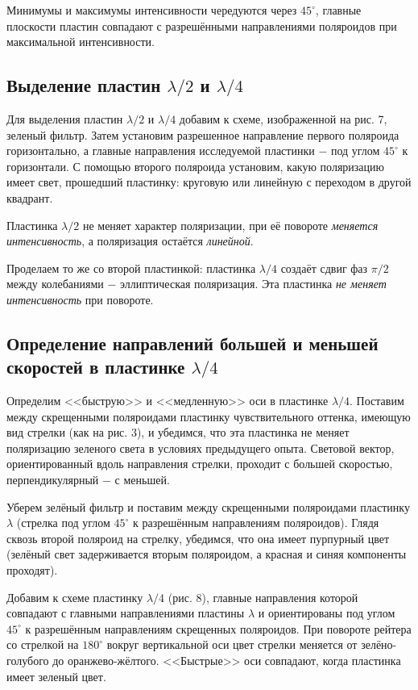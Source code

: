 \documentclass[a4paper,12pt]{article} %
\begin{document}
\hfill \break Минимумы и максимумы интенсивности чередуются через $45^\circ$, главные плоскости пластин совпадают с разрешёнными направлениями поляроидов при максимальной интенсивности.

\subsection{Выделение пластин $\lambda/2$ и $\lambda/4$}
\hfill \break Для выделения пластин $\lambda/2$ и $\lambda/4$ добавим к схеме, изображенной на рис. 7, зеленый фильтр. Затем установим разрешенное направление первого поляроида горизонтально, а главные направления исследуемой пластинки $-$ под углом $45^\circ$ к горизонтали. С помощью второго поляроида установим, какую поляризацию имеет свет, прошедший пластинку: круговую или линейную с переходом в другой квадрант. 

\hfill \break Пластинка $\lambda/2$ не меняет характер поляризации, при её повороте \textit{меняется интенсивность}, а поляризация остаётся \textit{линейной}.

\hfill \break Проделаем то же со второй пластинкой: пластинка $\lambda/4$ создаёт сдвиг фаз $\pi/2$ между колебаниями $-$ эллиптическая поляризация. Эта пластинка \textit{не меняет интенсивность} при повороте.

\subsection{Определение направлений большей и меньшей скоростей в пластинке $\lambda/4$}
\hfill \break Определим <<быструю>> и <<медленную>> оси в пластинке $\lambda/4$. Поставим между скрещенными поляроидами пластинку чувствительного оттенка, имеющую вид стрелки (как на рис. 3), и убедимся, что эта пластинка не меняет поляризацию зеленого света в условиях предыдущего опыта. Световой вектор, ориентированный вдоль направления стрелки, проходит с большей скоростью, перпендикулярный $-$ с меньшей.

\hfill \break Уберем зелёный фильтр и поставим между скрещенными поляроидами пластинку $\lambda$ (стрелка под углом $45^\circ $ к разрешённым направлениям поляроидов). Глядя сквозь второй поляроид на стрелку, убедимся, что она имеет пурпурный цвет (зелёный свет задерживается вторым поляроидом, а красная и синяя компоненты проходят).

\hfill \break Добавим к схеме пластинку $\lambda/4$ (рис. 8), главные направления которой совпадают с главными направлениями пластины $\lambda$ и ориентированы под углом $45^\circ$ к разрешённым направлениям скрещенных поляроидов. При повороте рейтера со стрелкой на $180^\circ$ вокруг вертикальной оси цвет стрелки меняется от зелёно-голубого до оранжево-жёлтого. <<Быстрые>> оси совпадают, когда пластинка имеет зеленый цвет. 
\end{document}
